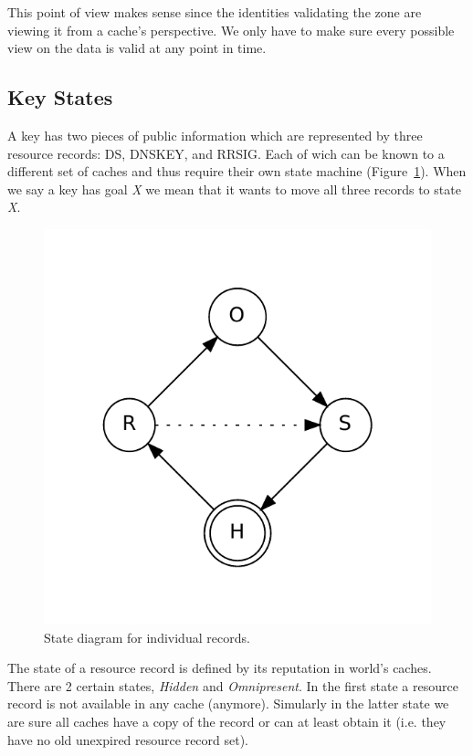 \documentclass[twoside,english, a4paper]{article}
\begin{document}
This point of view makes sense since the identities validating the 
zone are viewing it from a cache's perspective. We only have to make 
sure every
possible view on the data is valid at any point in time.

\subsection{Key States} \label{sec:keystates}

A key has two pieces of public information which are 
represented by three resource records: DS, DNSKEY, and RRSIG. Each of 
wich can be known to a different set of caches and thus require their
own state machine (Figure~\ref{fig:states}). When we say a key has 
goal \emph{X} we mean that it wants to move all three records to state
\emph{X}.

\begin{figure}[h]
	\centering
	\includegraphics[scale=0.5]{states.pdf}
	\caption{State diagram for individual records.}
	\label{fig:states}
\end{figure}

The state of a resource record is defined by its reputation in 
world's caches. There are 2 certain states, \emph{Hidden} and \emph
{Omnipresent}. In the first state a resource record is not available 
in any cache (anymore). Simularly in the latter state we are sure 
all caches have a copy of the record or can at least obtain it (i.e. 
they have no old unexpired resource record set).
\end{document}
